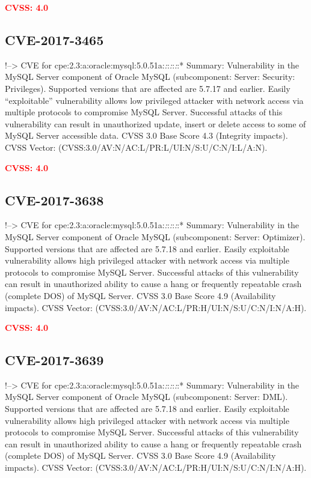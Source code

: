 \documentclass[a4paper, 12pt]{article}
\begin{document}
\textbf{\textcolor{red}{CVSS: 4.0}}

\hypertarget{cve-2017-3465}{%
\subsection{CVE-2017-3465}\label{cve-2017-3465}}

!--\textgreater{} CVE for
cpe:2.3:a:oracle:mysql:5.0.51a:\emph{:}:\emph{:}:\emph{:}:* Summary:
Vulnerability in the MySQL Server component of Oracle MySQL
(subcomponent: Server: Security: Privileges). Supported versions that
are affected are 5.7.17 and earlier. Easily ``exploitable''
vulnerability allows low privileged attacker with network access via
multiple protocols to compromise MySQL Server. Successful attacks of
this vulnerability can result in unauthorized update, insert or delete
access to some of MySQL Server accessible data. CVSS 3.0 Base Score 4.3
(Integrity impacts). CVSS Vector:
(CVSS:3.0/AV:N/AC:L/PR:L/UI:N/S:U/C:N/I:L/A:N).

\textbf{\textcolor{red}{CVSS: 4.0}}

\hypertarget{cve-2017-3638}{%
\subsection{CVE-2017-3638}\label{cve-2017-3638}}

!--\textgreater{} CVE for
cpe:2.3:a:oracle:mysql:5.0.51a:\emph{:}:\emph{:}:\emph{:}:* Summary:
Vulnerability in the MySQL Server component of Oracle MySQL
(subcomponent: Server: Optimizer). Supported versions that are affected
are 5.7.18 and earlier. Easily exploitable vulnerability allows high
privileged attacker with network access via multiple protocols to
compromise MySQL Server. Successful attacks of this vulnerability can
result in unauthorized ability to cause a hang or frequently repeatable
crash (complete DOS) of MySQL Server. CVSS 3.0 Base Score 4.9
(Availability impacts). CVSS Vector:
(CVSS:3.0/AV:N/AC:L/PR:H/UI:N/S:U/C:N/I:N/A:H).

\textbf{\textcolor{red}{CVSS: 4.0}}

\hypertarget{cve-2017-3639}{%
\subsection{CVE-2017-3639}\label{cve-2017-3639}}

!--\textgreater{} CVE for
cpe:2.3:a:oracle:mysql:5.0.51a:\emph{:}:\emph{:}:\emph{:}:* Summary:
Vulnerability in the MySQL Server component of Oracle MySQL
(subcomponent: Server: DML). Supported versions that are affected are
5.7.18 and earlier. Easily exploitable vulnerability allows high
privileged attacker with network access via multiple protocols to
compromise MySQL Server. Successful attacks of this vulnerability can
result in unauthorized ability to cause a hang or frequently repeatable
crash (complete DOS) of MySQL Server. CVSS 3.0 Base Score 4.9
(Availability impacts). CVSS Vector:
(CVSS:3.0/AV:N/AC:L/PR:H/UI:N/S:U/C:N/I:N/A:H).
\end{document}
